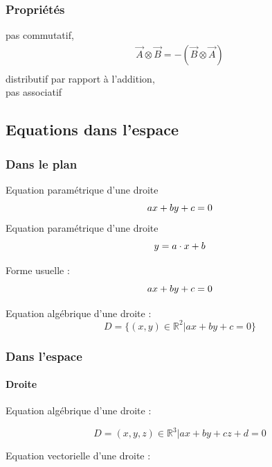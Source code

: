 \subsubsection{Propriétés}
pas commutatif,
\begin{eqnarray}
\vec{A} \otimes \vec{B}=-(\vec{B} \otimes \vec{A})\\
\end{eqnarray}
distributif par rapport à l'addition, \\

pas associatif

\subsection{Equations dans l'espace}
\subsubsection{Dans le plan}
Equation paramétrique d'une droite\\
\begin{equation}
ax+by+c=0\\
\end{equation}
Equation paramétrique d'une droite\\
\begin{equation}
y=a\cdot x+b\\
\end{equation}


Forme usuelle : 
\begin{equation}
ax+by+c=0\\
\end{equation}


Equation algébrique d'une droite :
\begin{equation}
D=\{(x,y) \in \mathbb{R} ^2 |ax+by+c=0\}
\end{equation}

\subsubsection{Dans l'espace}
\paragraph{Droite}
Equation algébrique d'une droite :

\begin{equation}
D={(x,y,z) \in \mathbb{R} ^3 |ax+by+cz+d=0}
\end{equation}

Equation vectorielle d'une droite :

